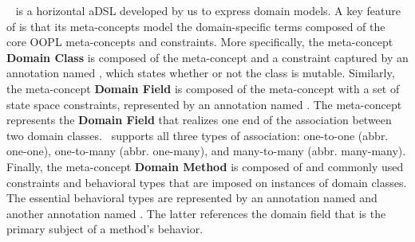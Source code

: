 ~\cite{le_domain_2018} is a horizontal aDSL developed by us to express domain models. A key feature of \dcsl is that its meta-concepts model the domain-specific terms composed of the core OOPL meta-concepts and constraints. More specifically, the meta-concept \textbf{Domain Class} is composed of the meta-concept  and a constraint captured by an annotation named , which states whether or not the class is mutable. Similarly, the meta-concept \textbf{Domain Field} is composed of the meta-concept  with a set of state space constraints, represented by an annotation named . The meta-concept  represents the \textbf{Domain Field} that realizes one end of the association between two domain classes. \dcsl~supports all three types of association: one-to-one (abbr. one-one), one-to-many (abbr. one-many), and many-to-many (abbr. many-many). Finally, the meta-concept \textbf{Domain Method} is composed of  and commonly used constraints and behavioral types that are imposed on instances of domain classes. The essential behavioral types are represented by an annotation named  and another annotation named . The latter references the domain field that is the primary subject of a method's behavior.

